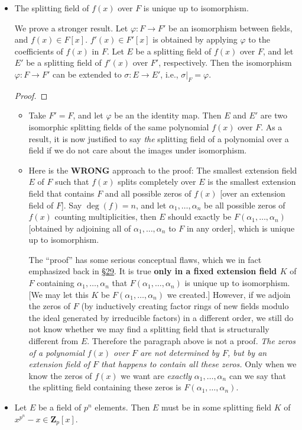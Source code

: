 \documentclass[11pt]{article}
\newcommand{\lk}[2]{\hyperlink{subsection.#1.#2}{\S#2}} %
\newcommand{\Z}{\mathbf{Z}}
\renewcommand{\phi}{\varphi}
\begin{document}
\begin{itemize}
    \item The splitting field of $f(x)$ over $F$ is unique up to isomorphism.
    
    We prove a stronger result. Let $\phi: F \to F'$ be an isomorphism between fields, and $f(x) \in F[x]$. $f'(x) \in F'[x]$ is obtained by applying $\phi$ to the coefficients of $f(x)$ in $F$. Let $E$ be a splitting field of $f(x)$ over $F$, and let $E'$ be a splitting field of $f'(x)$ over $F'$, respectively. Then the isomorphism $\phi: F \to F'$ can be extended to $\sigma: E \to E'$, i.e., $\sigma|_F = \phi$.
    \begin{proof}
        
    \end{proof}
    \begin{itemize}
        \item Take $F' = F$, and let $\phi$ be an the identity map. Then $E$ and $E'$ are two isomorphic splitting fields of the same polynomial $f(x)$ over $F$. As a result, it is now justified to say \emph{the} splitting field of a polynomial over a field if we do not care about the images under isomorphism.
        \item Here is the \textbf{WRONG} approach to the proof: The smallest extension field $E$ of $F$ such that $f(x)$ splits completely over $E$ is the smallest extension field that contains $F$ and all possible zeros of $f(x)$ [over an extension field of $F$]. Say $\deg(f) = n$, and let $\alpha_1,\dots,\alpha_n$ be all possible zeros of $f(x)$ counting multiplicities, then $E$ should exactly be $F(\alpha_1,\dots,\alpha_n)$ [obtained by adjoining all of $\alpha_1,\dots,\alpha_n$ to $F$ in any order], which is unique up to isomorphism.
        
        The ``proof'' has some serious conceptual flaws, which we in fact emphasized back in \lk{6}{29}. It is true \textbf{only in a fixed extension field $K$} of $F$ containing $\alpha_1,\dots,\alpha_n$ that $F(\alpha_1,\dots,\alpha_n)$ is unique up to isomorphism. [We may let this $K$ be $F(\alpha_1,\dots,\alpha_n)$ we created.] However, if we adjoin the zeros of $F$ (by inductively creating factor rings of new fields modulo the ideal generated by irreducible factors) in a different order, we still do not know whether we may find a splitting field that is structurally different from $E$. Therefore the paragraph above is not a proof. \emph{The zeros of a polynomial $f(x)$ over $F$ are not determined by $F$, but by an extension field of $F$ that happens to contain all these zeros.} Only when we know the zeros of $f(x)$ we want are \emph{exactly} $\alpha_1,\dots,\alpha_n$ can we say that the splitting field containing these zeros is $F(\alpha_1,\dots,\alpha_n)$.
    \end{itemize}
    \item Let $E$ be a field of $p^n$ elements. Then $E$ must be in some splitting field $K$ of $x^{p^n}-x \in \Z_p[x]$.


\end{itemize}
\end{document}
